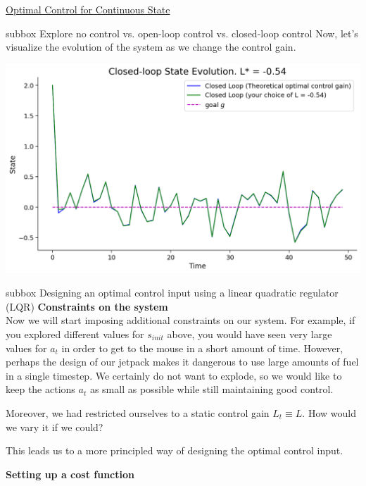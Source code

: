 \begin{textbox}{\href{https://compneuro.neuromatch.io/tutorials/W3D3_OptimalControl/student/W3D3_Tutorial2.html}{Optimal Control for Continuous State}}
\begin{subbox}{subbox}{ Explore no control vs. open-loop control vs. closed-loop control}
\scriptsize
Now, let's visualize the evolution of the system as we change the control gain. 

\begin{center}
    
\includegraphics[scale=0.2]{Figures/OC/OC_Figure8.png}
\end{center}


\end{subbox}

\begin{subbox}{subbox}{ Designing an optimal control input using a linear quadratic regulator (LQR)}
\scriptsize
\textbf{Constraints on the system}\\
Now we will start imposing additional constraints on our system. For example, if you explored different values for $s_{init}$ above, you would have seen very large values for $a_t$ in order to get to the mouse in a short amount of time. However, perhaps the design of our jetpack makes it dangerous to use large amounts of fuel in a single timestep. We certainly do not want to explode, so we would like to keep the actions $a_t$ as small as possible while still maintaining good control.

Moreover, we had restricted ourselves to a static control gain $L_t \equiv L$. How would we vary it if we could?

This leads us to a more principled way of designing the optimal control input.

\textbf{Setting up a cost function}\\


\end{subbox}
\end{textbox}
